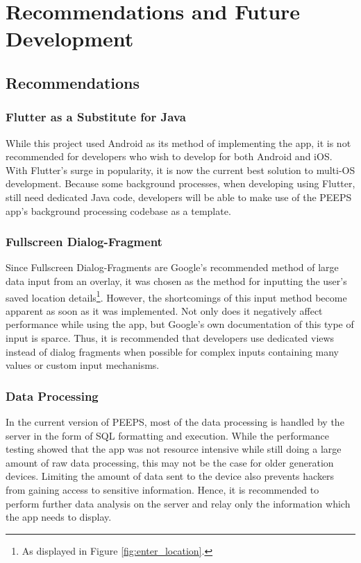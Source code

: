\chapter{Recommendations and Future Development}

\section{Recommendations}

\subsection{Flutter as a Substitute for Java}
While this project used Android as its method of implementing the app, it is not recommended for developers who wish to develop for both Android and iOS. With Flutter's surge in popularity, it is now the current best solution to multi-OS development. Because some background processes, when developing using Flutter, still need dedicated Java code, developers  will be able to make use of the PEEPS app's background processing codebase as a template.

\subsection{Fullscreen Dialog-Fragment}
Since Fullscreen Dialog-Fragments are Google's recommended method of large data input from an overlay, it was chosen as the method for inputting the user's saved location details\footnote{As displayed in Figure \ref{fig:enter_location}.}. However, the shortcomings of this input method become apparent as soon as it was implemented. Not only does it negatively affect performance while using the app, but Google's own documentation of this type of input is sparce. Thus, it is recommended that developers use dedicated views instead of dialog fragments when possible for complex inputs containing many values or custom input mechanisms. 




\subsection{Data Processing}
In the current version of PEEPS, most of the data processing is handled by the server in the form of SQL formatting and execution. While the performance testing showed that the app was not resource intensive while still doing a large amount of raw data processing, this may not be the case for older generation devices. Limiting the amount of data sent to the device also prevents hackers from gaining access to sensitive information. Hence, it is recommended to perform further data analysis on the server and relay only the information which the app needs to display.

